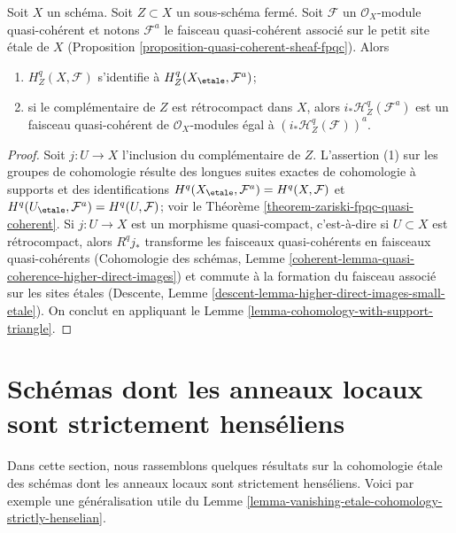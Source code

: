 \begin{lemma}
\label{lemma-cohomology-with-support-quasi-coherent}
Soit $X$ un schéma. Soit $Z \subset X$ un sous-schéma fermé.
Soit $\mathcal{F}$ un $\mathcal{O}_X$-module quasi-cohérent
et notons $\mathcal{F}^a$ le faisceau quasi-cohérent associé
sur le petit site étale de $X$
(Proposition \ref{proposition-quasi-coherent-sheaf-fpqc}). Alors
\begin{enumerate}
\item $H^q_Z(X, \mathcal{F})$ s'identifie à $H^q_Z(X_\etale, \mathcal{F}^a)$;
\item si le complémentaire de $Z$ est rétrocompact dans $X$, alors
$i_*\mathcal{H}^q_Z(\mathcal{F}^a)$ est un faisceau quasi-cohérent de
$\mathcal{O}_X$-modules égal à $(i_*\mathcal{H}^q_Z(\mathcal{F}))^a$.
\end{enumerate}
\end{lemma}

\begin{proof}
Soit $j : U \to X$ l'inclusion du complémentaire de $Z$.
L'assertion (1) sur les groupes de cohomologie résulte des longues
suites exactes de cohomologie à supports et des identifications
$H^q(X_\etale, \mathcal{F}^a) = H^q(X, \mathcal{F})$ et
$H^q(U_\etale, \mathcal{F}^a) = H^q(U, \mathcal{F})$; voir le
Théorème \ref{theorem-zariski-fpqc-quasi-coherent}.
Si $j : U \to X$ est un morphisme quasi-compact, c'est-à-dire si $U \subset X$
est rétrocompact, alors $R^qj_*$ transforme les faisceaux quasi-cohérents
en faisceaux quasi-cohérents
(Cohomologie des schémas, Lemme
\ref{coherent-lemma-quasi-coherence-higher-direct-images})
et commute à la formation du
faisceau associé sur les sites étales
(Descente, Lemme \ref{descent-lemma-higher-direct-images-small-etale}).
On conclut en appliquant le
Lemme \ref{lemma-cohomology-with-support-triangle}.
\end{proof}







\section{Schémas dont les anneaux locaux sont strictement henséliens}
\label{section-strictly-henselian-local-rings}

\noindent
Dans cette section, nous rassemblons quelques résultats sur la cohomologie étale
des schémas dont les anneaux locaux sont strictement henséliens. Voici par exemple
une généralisation utile du
Lemme \ref{lemma-vanishing-etale-cohomology-strictly-henselian}.

